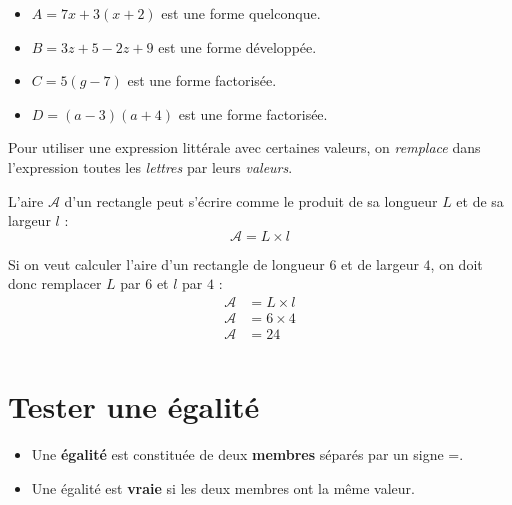 \documentclass[a4paper,11pt]{article}
\begin{document}
\begin{exemple}
	\begin{itemize}
		\item $A = 7x + 3(x+2)$ est une forme quelconque.
		\item $B = 3z + 5 - 2z + 9$ est une forme développée.
		\item $C = 5(g - 7)$ est une forme factorisée.
		\item $D = (a - 3) (a + 4)$ est une forme factorisée.
	\end{itemize}
\end{exemple}

\begin{cours}
	Pour utiliser une expression littérale avec certaines valeurs, on \textit{remplace} dans l'expression toutes les \textit{lettres} par leurs \textit{valeurs}.
\end{cours}

\begin{exemple}
	L'aire $𝒜$ d'un rectangle peut s'écrire comme le produit de sa longueur $L$ et de sa largeur $𝑙$ :
	$$ 𝒜 = L × 𝑙 $$

	Si on veut calculer l'aire d'un rectangle de longueur $6$ et de largeur $4$, on doit donc remplacer $L$ par $6$ et $𝑙$ par $4$ :
	\begin{align*}
		𝒜 & = L × 𝑙 \\
		𝒜 & = 6 × 4 \\
		𝒜 & = 24    \\
	\end{align*}
\end{exemple}

\section{Tester une égalité}

\begin{cours}[Égalité]
	\begin{itemize}
		\item Une \textbf{égalité} est constituée de deux \textbf{membres} séparés par un signe =.
		\item Une égalité est \textbf{vraie} si les deux membres ont la même valeur.
	\end{itemize}
\end{cours}
\end{document}
